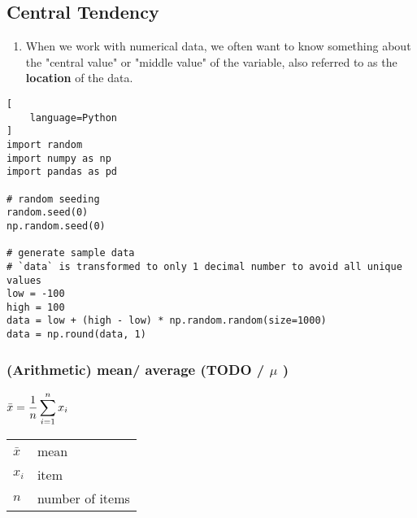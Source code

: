 \subsection{Central Tendency \cite{statistics/book/Statistics-for-Data-Scientists/Maurits-Kaptein}}\label{Data/Describing Data/Central Tendency}

\begin{enumerate}
     \item When we work with numerical data, we often want to know something about the "central value" or "middle value" of the variable, also referred to as the \textbf{location}\label{Data/Describing Data/Central Tendency/location} of the data. \hfill \cite{statistics/book/Statistics-for-Data-Scientists/Maurits-Kaptein}
\end{enumerate}

\begin{lstlisting}[
    language=Python
]
import random
import numpy as np
import pandas as pd

# random seeding
random.seed(0)
np.random.seed(0)

# generate sample data
# `data` is transformed to only 1 decimal number to avoid all unique values
low = -100
high = 100
data = low + (high - low) * np.random.random(size=1000)
data = np.round(data, 1)
\end{lstlisting}

\subsubsection{(Arithmetic) mean/ average (TODO / $\mu$ ) \cite{statistics/book/Statistics-for-Data-Scientists/Maurits-Kaptein}} \label{Data/Describing Data/Central Tendency/(Arithmetic) mean or average}

\begin{table}[H]
    \begin{minipage}{0.3\linewidth}
        $
            \bar{x} = \dfrac{1}{n} \displaystyle\sum_{i=1}^{n} x_i
        $
    \end{minipage}
    \begin{minipage}{0.65\linewidth}
        \begin{table}[H]
            \begin{tabular}{l l}
                $\bar{x}$ & mean \\
                $x_i$ & item \\
                $n$ & number of items \\
            \end{tabular}
        \end{table}
    \end{minipage}
\end{table}


